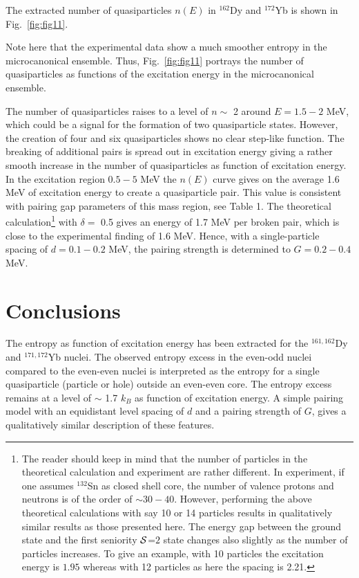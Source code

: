 The extracted number of quasiparticles $n(E)$ in $^{162}$Dy and $^{172}$Yb is shown in Fig.\ \ref{fig:fig11}. 

Note here that 
the experimental  
data show a much smoother entropy in the microcanonical
ensemble. Thus, Fig.~\ref{fig:fig11} portrays the number of quasiparticles
as functions of the excitation
energy in the microcanonical ensemble. 

The number of quasiparticles raises to a level of $n \sim $ 2 around $E = 1.5 - 2$ MeV, which could be a signal for the formation of two quasiparticle states. However, the creation of four and six quasiparticles shows no clear step-like function. The breaking of additional pairs is spread out in excitation energy giving a rather smooth increase in the number of quasiparticles as function of excitation energy. In the excitation region $0.5 - 5$ MeV the $n(E)$ curve gives on the average 1.6 MeV of excitation energy to create a quasiparticle pair. This value is consistent with pairing gap parameters of this mass region, see Table 1. The theoretical calculation\footnote{The reader should keep in mind that the number of particles in the theoretical calculation and experiment are rather different. In experiment, if one assumes $^{132}$Sn as closed shell core, the number of valence protons and neutrons is of the order of $\sim 30-40$. However, performing the above theoretical calculations with say 10 or 14 particles results in qualitatively similar results as those presented here.
The energy gap between the ground state and the first seniority 
${\cal S}$=$2$ state changes also slightly as the number of particles increases. To give an example, with 10 particles the excitation energy is $1.95$
whereas with 12 particles as here the spacing is 2.21.}
with $\delta =$ 0.5 gives an energy of 1.7 MeV per broken pair, which is close to the experimental finding of 1.6 MeV. Hence, with a single-particle spacing of $d = 0.1 - 0.2$ MeV, the pairing strength is determined to $G = 0.2 - 0.4$ MeV.


\section{Conclusions}

The entropy as function of excitation energy has been extracted for the $^{161,162}$Dy and $^{171,172}$Yb nuclei. The observed entropy excess in the even-odd nuclei compared to the even-even nuclei is interpreted as the entropy for a single quasiparticle (particle or hole) outside an even-even core. The entropy excess remains at a level of $\sim$ 1.7 $k_B$ as function of excitation energy. A simple pairing model with an equidistant level spacing of $d$ and a pairing strength of $G$, gives a qualitatively similar description of these features.

